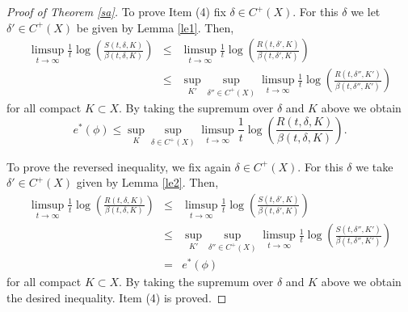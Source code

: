 \documentclass[11pt,letterpaper]{amsart}
\begin{document}
\begin{proof}[Proof of Theorem \ref{sa}]
To prove Item (4) fix $\delta\in C^+(X)$. For this $\delta$ we let
$\delta'\in C^+(X)$ be given by Lemma \ref{le1}. Then, 
\begin{eqnarray*}
\limsup_{t\to\infty}\frac{1}t\log\left(\frac{S(t,\delta,K)}{\beta(t,\delta,K)}\right)&\leq&
\limsup_{t\to\infty}\frac{1}t\log\left(\frac{R(t,\delta',K)}{\beta(t,\delta',K)}\right)\\
&\leq&
\sup_{K'}\sup_{\delta''\in C^+(X)}\limsup_{t\to\infty}\frac{1}t\log \left(\frac{R(t,\delta'',K')}{\beta(t,\delta'',K')}\right)
\end{eqnarray*}
for all compact $K\subset X$.
By taking the supremum over $\delta$ and $K$ above we obtain
$$
e^*(\phi)\leq\sup_K\sup_{\delta\in C^+(X)}\limsup_{t\to\infty}\frac{1}t\log \left(\frac{R(t,\delta,K)}{\beta(t,\delta,K)}\right).
$$

To prove the reversed inequality,
we fix again $\delta\in C^+(X)$. For this $\delta$ we take $\delta'\in C^+(X)$ given by Lemma \ref{le2}.
Then,
\begin{eqnarray*}
\limsup_{t\to\infty}\frac{1}t\log\left(\frac{R(t,\delta,K)}{\beta(t,\delta,K)}\right)&\leq&
\limsup_{t\to\infty}\frac{1}t\log\left(\frac{S(t,\delta',K)}{\beta(t,\delta',K)}\right)\\
&\leq& \sup_{K'}\sup_{\delta''\in C^+(X)}\limsup_{t\to\infty}\frac{1}t\log \left(\frac{S(t,\delta'',K')}{\beta(t,\delta'',K')}\right)\\
&=& e^*(\phi)
\end{eqnarray*}
for all compact $K\subset X$.
By taking the supremum over $\delta$ and $K$ above we obtain the desired inequality.
Item (4) is proved.
\end{proof}
\end{document}
